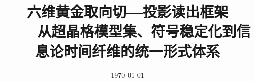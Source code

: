 \documentclass[11pt,letterpaper]{ctexart}
\title{六维黄金取向切—投影读出框架\\\large ——从超晶格模型集、符号稳定化到信息论时间纤维的统一形式体系}
\author{}
\date{\today}
\begin{document}
\maketitle















\FloatBarrier
\appendix


\FloatBarrier

\end{document}
